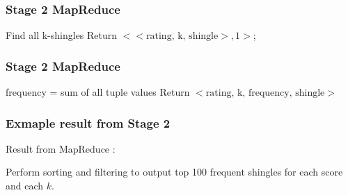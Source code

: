 \documentclass[11pt]{beamer}
\begin{document}
\begin{frame}
\frametitle{Stage 2 MapReduce}

\begin{tcolorbox}[
	colback=blue!5,
	colframe=blue!40!black,
	title=\textbf{Algorithm 2}: MapReduce (Mapper)
	]
\begin{algorithm}[H]
	{
		{
			\label{forins}
			Find all k-shingles\;
			{
				Return \(<<\mbox{rating, k, shingle}>, 1>\);
			}
 		}
	}
\end{algorithm}
\end{tcolorbox}

\end{frame}

\begin{frame}
\frametitle{Stage 2 MapReduce}

\begin{tcolorbox}[
	colback=blue!5,
	colframe=blue!30!black,
	title=\textbf{Algorithm 2}: MapReduce (Reducer)
	]
\begin{algorithm}[H]
	 {
		frequency = sum of all tuple values\;
		Return \(<\mbox{rating, k, frequency, shingle}>\)\;
	}
\end{algorithm}
\end{tcolorbox}

\end{frame}

\begin{frame}
\frametitle{Exmaple result from Stage 2}

Result from MapReduce : \\
\vspace{5mm}
\vspace{5mm}

Perform sorting and filtering to output top 100 frequent shingles for each score and each \(k\).

\end{frame}
\end{document}
